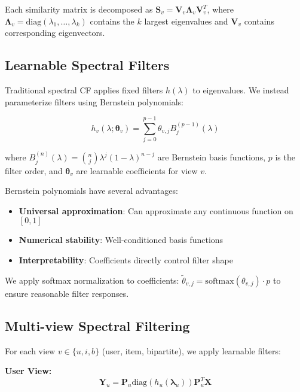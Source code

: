 \documentclass[10pt,twocolumn,letterpaper]{article}
\begin{document}
Each similarity matrix is decomposed as $\mathbf{S}_v = \mathbf{V}_v \mathbf{\Lambda}_v \mathbf{V}_v^T$, where $\mathbf{\Lambda}_v = \text{diag}(\lambda_1, \ldots, \lambda_k)$ contains the $k$ largest eigenvalues and $\mathbf{V}_v$ contains corresponding eigenvectors.

\subsection{Learnable Spectral Filters}

Traditional spectral CF applies fixed filters $h(\lambda)$ to eigenvalues. We instead parameterize filters using Bernstein polynomials:

\begin{equation}
h_v(\lambda; \boldsymbol{\theta}_v) = \sum_{j=0}^{p-1} \theta_{v,j} B_j^{(p-1)}(\lambda)
\end{equation}

where $B_j^{(n)}(\lambda) = \binom{n}{j} \lambda^j (1-\lambda)^{n-j}$ are Bernstein basis functions, $p$ is the filter order, and $\boldsymbol{\theta}_v$ are learnable coefficients for view $v$.

Bernstein polynomials have several advantages:
\begin{itemize}
    \item \textbf{Universal approximation}: Can approximate any continuous function on $[0,1]$
    \item \textbf{Numerical stability}: Well-conditioned basis functions
    \item \textbf{Interpretability}: Coefficients directly control filter shape
\end{itemize}

We apply softmax normalization to coefficients: $\tilde{\theta}_{v,j} = \text{softmax}(\theta_{v,j}) \cdot p$ to ensure reasonable filter responses.

\subsection{Multi-view Spectral Filtering}

For each view $v \in \{u, i, b\}$ (user, item, bipartite), we apply learnable filters:

\textbf{User View:}
\begin{equation}
\mathbf{Y}_u = \mathbf{P}_u \text{diag}(h_u(\boldsymbol{\lambda}_u)) \mathbf{P}_u^T \mathbf{X}
\end{equation}
\end{document}
